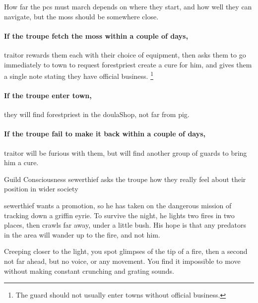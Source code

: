 How far the \glspl{pc} must march depends on where they start, and how well they can navigate,%
but the moss should be somewhere close.

\paragraph{If the troupe fetch the moss within a couple of days,}
\gls{traitor} rewards them each with their choice of equipment, then asks them to go immediately to \gls{town} to request \gls{forestpriest} create a cure for him, and gives them a single note stating they have official business.%
\footnote{The \gls{guard} should not usually enter towns without official business.}

\paragraph{If the troupe enter \gls{town},}
they will find \gls{forestpriest} in the \gls{doulaShop}, not far from \gls{pig}.

\paragraph{If the troupe fail to make it back within a couple of days,}
\gls{traitor} will be furious with them, but will find another group of \glspl{guard} to bring him a cure.

{Guild Consciousness}%
{\gls{sewerthief} asks the troupe how they really feel about their position in wider society}%

\Gls{sewerthief} wants a promotion, so he has taken on the dangerous mission of tracking down a griffin eyrie.
To survive the night, he lights two fires in two places, then crawls far away, under a little bush.
His hope is that any predators in the area will wander up to the fire, and not him.

\begin{boxtext}
  Creeping closer to the light, you spot glimpses of the tip of a fire, then a second not far ahead, but no voice, or any movement.
  You find it impossible to move without making constant crunching and grating sounds.
\end{boxtext}

\renewcommand\npcQuote{What was that?\ldots maybe the wind.
The wind is always playing tricks on me.}

\sewerthief

